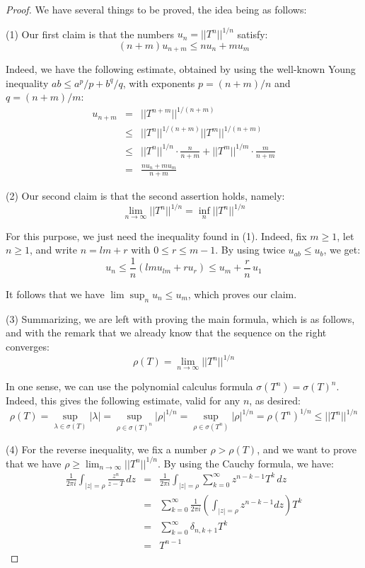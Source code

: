 \documentclass[12pt]{amsbook}
\begin{document}
\begin{proof}
We have several things to be proved, the idea being as follows:

\medskip

(1) Our first claim is that the numbers $u_n=||T^n||^{1/n}$ satisfy:
$$(n+m)u_{n+m}\leq nu_n+mu_m$$

Indeed, we have the following estimate, obtained by using the well-known Young inequality $ab\leq a^p/p+b^q/q$, with exponents $p=(n+m)/n$ and $q=(n+m)/m$:
\begin{eqnarray*}
u_{n+m}
&=&||T^{n+m}||^{1/(n+m)}\\
&\leq&||T^n||^{1/(n+m)}||T^m||^{1/(n+m)}\\
&\leq&||T^n||^{1/n}\cdot\frac{n}{n+m}+||T^m||^{1/m}\cdot\frac{m}{n+m}\\
&=&\frac{nu_n+mu_m}{n+m}
\end{eqnarray*}

(2) Our second claim is that the second assertion holds, namely:
$$\lim_{n\to\infty}||T^n||^{1/n}=\inf_n||T^n||^{1/n}$$

For this purpose, we just need the inequality found in (1). Indeed, fix $m\geq1$, let $n\geq1$, and write $n=lm+r$ with $0\leq r\leq m-1$. By using twice $u_{ab}\leq u_b$, we get:
$$u_n
\leq\frac{1}{n}( lmu_{lm}+ru_r)
\leq u_{m}+\frac{r}{n}\,u_1$$

It follows that we have $\lim\sup_nu_n\leq u_m$, which proves our claim.

\medskip

(3) Summarizing, we are left with proving the main formula, which is as follows, and with the remark that we already know that the sequence on the right converges:
$$\rho(T)=\lim_{n\to\infty}||T^n||^{1/n}$$

In one sense, we can use the polynomial calculus formula $\sigma(T^n)=\sigma(T)^n$. Indeed, this gives the following estimate, valid for any $n$, as desired:
$$\rho(T)
=\sup_{\lambda\in\sigma(T)}|\lambda|
=\sup_{\rho\in\sigma(T)^n}|\rho|^{1/n}
=\sup_{\rho\in\sigma(T^n)}|\rho|^{1/n}
=\rho(T^n)^{1/n}
\leq||T^n||^{1/n}$$

(4) For the reverse inequality, we fix a number $\rho>\rho(T)$, and we want to prove that we have $\rho\geq\lim_{n\to\infty}||T^n||^{1/n}$. By using the Cauchy formula, we have:
\begin{eqnarray*}
\frac{1}{2\pi i}\int_{|z|=\rho}\frac{z^n}{z-T}\,dz
&=&\frac{1}{2\pi i}\int_{|z|=\rho}\sum_{k=0}^\infty z^{n-k-1}T^k\,dz\\
&=&\sum_{k=0}^\infty\frac{1}{2\pi i}\left(\int_{|z|=\rho}z^{n-k-1}dz\right)T^k\\
&=&\sum_{k=0}^\infty\delta_{n,k+1}T^k\\
&=&T^{n-1}
\end{eqnarray*}


\end{proof}
\end{document}
